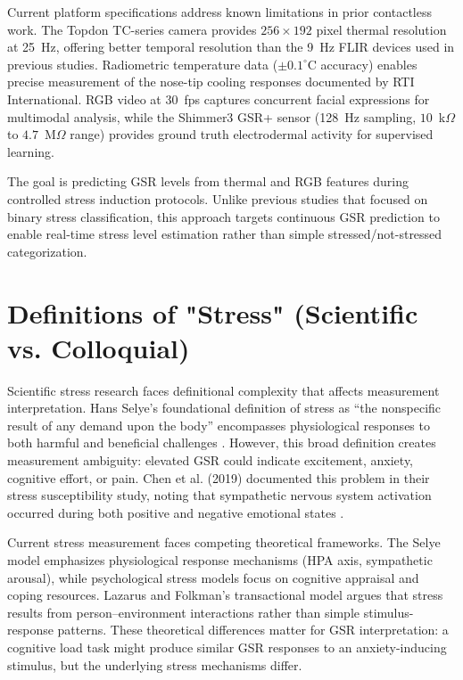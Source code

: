 \documentclass{report}
\begin{document}
    Current platform specifications address known limitations in prior contactless work. The Topdon TC-series camera provides $256 \times 192$ pixel thermal resolution at 25~Hz, offering better temporal resolution than the 9~Hz FLIR devices used in previous studies. Radiometric temperature data ($\pm 0.1^{\circ}$C accuracy) enables precise measurement of the nose-tip cooling responses documented by RTI International. RGB video at 30~fps captures concurrent facial expressions for multimodal analysis, while the Shimmer3 GSR+ sensor (128~Hz sampling, $10$~k$\Omega$ to $4.7$~M$\Omega$ range) provides ground truth electrodermal activity for supervised learning.

    The goal is predicting GSR levels from thermal and RGB features during controlled stress induction protocols. Unlike previous studies that focused on binary stress classification, this approach targets continuous GSR prediction to enable real-time stress level estimation rather than simple stressed/not-stressed categorization.

    \section{Definitions of "Stress" (Scientific vs. Colloquial)}
    \label{sec:stress_definitions}

    Scientific stress research faces definitional complexity that affects measurement interpretation. Hans Selye's foundational definition of stress as ``the nonspecific result of any demand upon the body'' encompasses physiological responses to both harmful and beneficial challenges \cite{selye11}. However, this broad definition creates measurement ambiguity: elevated GSR could indicate excitement, anxiety, cognitive effort, or pain. Chen et al. (2019) documented this problem in their stress susceptibility study, noting that sympathetic nervous system activation occurred during both positive and negative emotional states \cite{chen2019}.

    Current stress measurement faces competing theoretical frameworks. The Selye model emphasizes physiological response mechanisms (HPA axis, sympathetic arousal), while psychological stress models focus on cognitive appraisal and coping resources. Lazarus and Folkman's transactional model argues that stress results from person--environment interactions rather than simple stimulus-response patterns. These theoretical differences matter for GSR interpretation: a cognitive load task might produce similar GSR responses to an anxiety-inducing stimulus, but the underlying stress mechanisms differ.
\end{document}
